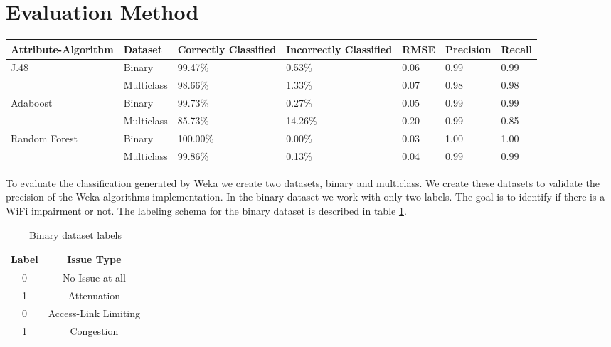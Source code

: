 \section{Evaluation Method}\label{Evaluation_Method}

\begin{table*}[!bp]
	\begin{center}
		\begin{tabular}{|| m{2.5cm} | m{2cm} | m{2cm}| m{2cm} | m{2cm}| m{2cm} | m{2cm}  ||}
			\hline
			Attribute-Algorithm & Dataset & Correctly Classified & Incorrectly Classified & RMSE & Precision & Recall \\ [0.5ex] 
			\hline\hline
			\multirow{2}{*}{J.48} & Binary & 99.47\% & 0.53\% & 0.06 & 0.99 & 0.99 \\
			& Multiclass & 98.66\% & 1.33\% & 0.07 & 0.98 & 0.98 \\
			\multirow{2}{*}{Adaboost} & Binary & 99.73\% & 0.27\% & 0.05 & 0.99 & 0.99 \\
			& Multiclass & 85.73\% & 14.26\% & 0.20 & 0.99 & 0.85 \\
			\multirow{2}{*}{Random Forest} & Binary & 100.00\% & 0.00\% & 0.03 & 1.00 & 1.00 \\
			& Multiclass & 99.86\% & 0.13\% & 0.04 & 0.99 & 0.99 \\
			\hline
		\end{tabular}
		\caption{Classification Results}
		\label{table:classification_results}
	\end{center}
\end{table*}

To evaluate the classification generated by Weka we create two datasets, binary and multiclass. We create these datasets to validate the precision of the Weka algorithms implementation. In the binary dataset we work with only two labels. The goal is to identify if there is a WiFi impairment or not. The labeling schema for the binary dataset is described in table \ref{table:binary_labels}.

\begin{table}[!h]
	\begin{center}
		\begin{tabular}{||c c||} 
			\hline
			Label & Issue Type\\ [0.5ex] 
			\hline\hline
			0 & No Issue at all \\ 
			\hline
			1 & Attenuation\\
			\hline
			0 & Access-Link Limiting \\
			\hline
			1 & Congestion \\[1ex] 
			\hline
		\end{tabular}
		\caption{Binary dataset labels}
		\label{table:binary_labels}
	\end{center}
\end{table}

